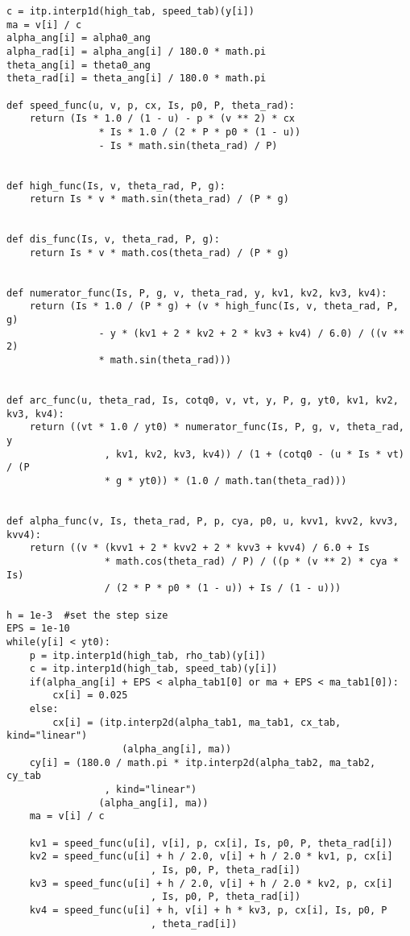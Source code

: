 \documentclass{ctexart}
\begin{document}
\begin{lstlisting}
c = itp.interp1d(high_tab, speed_tab)(y[i])
ma = v[i] / c
alpha_ang[i] = alpha0_ang
alpha_rad[i] = alpha_ang[i] / 180.0 * math.pi
theta_ang[i] = theta0_ang
theta_rad[i] = theta_ang[i] / 180.0 * math.pi

def speed_func(u, v, p, cx, Is, p0, P, theta_rad):
	return (Is * 1.0 / (1 - u) - p * (v ** 2) * cx
                * Is * 1.0 / (2 * P * p0 * (1 - u))
                - Is * math.sin(theta_rad) / P)


def high_func(Is, v, theta_rad, P, g):
	return Is * v * math.sin(theta_rad) / (P * g)


def dis_func(Is, v, theta_rad, P, g):
	return Is * v * math.cos(theta_rad) / (P * g)
	

def numerator_func(Is, P, g, v, theta_rad, y, kv1, kv2, kv3, kv4):
	return (Is * 1.0 / (P * g) + (v * high_func(Is, v, theta_rad, P, g)
                - y * (kv1 + 2 * kv2 + 2 * kv3 + kv4) / 6.0) / ((v ** 2)
                * math.sin(theta_rad)))


def arc_func(u, theta_rad, Is, cotq0, v, vt, y, P, g, yt0, kv1, kv2, kv3, kv4):
	return ((vt * 1.0 / yt0) * numerator_func(Is, P, g, v, theta_rad, y
                 , kv1, kv2, kv3, kv4)) / (1 + (cotq0 - (u * Is * vt) / (P
                 * g * yt0)) * (1.0 / math.tan(theta_rad)))


def alpha_func(v, Is, theta_rad, P, p, cya, p0, u, kvv1, kvv2, kvv3, kvv4):
	return ((v * (kvv1 + 2 * kvv2 + 2 * kvv3 + kvv4) / 6.0 + Is
                 * math.cos(theta_rad) / P) / ((p * (v ** 2) * cya * Is)
                 / (2 * P * p0 * (1 - u)) + Is / (1 - u)))

h = 1e-3  #set the step size
EPS = 1e-10
while(y[i] < yt0):
	p = itp.interp1d(high_tab, rho_tab)(y[i])
	c = itp.interp1d(high_tab, speed_tab)(y[i])
	if(alpha_ang[i] + EPS < alpha_tab1[0] or ma + EPS < ma_tab1[0]):
		cx[i] = 0.025
	else:
		cx[i] = (itp.interp2d(alpha_tab1, ma_tab1, cx_tab, kind="linear")
                    (alpha_ang[i], ma))
	cy[i] = (180.0 / math.pi * itp.interp2d(alpha_tab2, ma_tab2, cy_tab
                 , kind="linear")
                (alpha_ang[i], ma))
	ma = v[i] / c

	kv1 = speed_func(u[i], v[i], p, cx[i], Is, p0, P, theta_rad[i])
	kv2 = speed_func(u[i] + h / 2.0, v[i] + h / 2.0 * kv1, p, cx[i]
                         , Is, p0, P, theta_rad[i])
	kv3 = speed_func(u[i] + h / 2.0, v[i] + h / 2.0 * kv2, p, cx[i]
                         , Is, p0, P, theta_rad[i])
	kv4 = speed_func(u[i] + h, v[i] + h * kv3, p, cx[i], Is, p0, P
                         , theta_rad[i])


\end{lstlisting}
\end{document}
